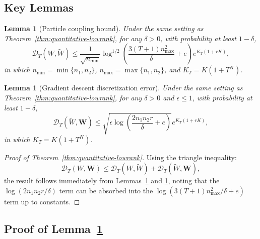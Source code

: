 \documentclass[nohyperref]{article}
\theoremstyle{plain}
\newtheorem{lemma}[theorem]{Lemma}
\theoremstyle{definition}
\theoremstyle{remark}
\begin{document}
\subsection{Key Lemmas}

\begin{lemma}[Particle coupling bound]
\label{lem:particle-lowrank}
Under the same setting as Theorem~\ref{thm:quantitative-lowrank}, for any $\delta > 0$, with probability at least $1-\delta$,
\[
\mathscr{D}_T(W, \tilde{W}) \le \frac{1}{\sqrt{n_{\min}}}\log^{1/2}\left(\frac{3(T+1)n_{\max}^2}{\delta} + e\right)e^{K_T(1+rK)},
\]
in which $n_{\min} = \min\{n_1, n_2\}$, $n_{\max} = \max\{n_1, n_2\}$, and $K_T = K(1+T^K)$.
\end{lemma}

\begin{lemma}[Gradient descent discretization error]
\label{lem:gradient-lowrank}
Under the same setting as Theorem~\ref{thm:quantitative-lowrank}, for any $\delta > 0$ and $\epsilon \le 1$, with probability at least $1-\delta$,
\[
\mathscr{D}_T(\tilde{W}, \mathbf{W}) \le \sqrt{\epsilon\log\left(\frac{2n_1n_2r}{\delta} + e\right)}e^{K_T(1+rK)},
\]
in which $K_T = K(1+T^K)$.
\end{lemma}

\begin{proof}[Proof of Theorem~\ref{thm:quantitative-lowrank}]
Using the triangle inequality:
\[
\mathscr{D}_T(W, \mathbf{W}) \le \mathscr{D}_T(W, \tilde{W}) + \mathscr{D}_T(\tilde{W}, \mathbf{W}),
\]
the result follows immediately from Lemmas~\ref{lem:particle-lowrank} and \ref{lem:gradient-lowrank}, noting that the $\log(2n_1n_2r/\delta)$ term can be absorbed into the $\log(3(T+1)n_{\max}^2/\delta + e)$ term up to constants.
\end{proof}

\subsection{Proof of Lemma~\ref{lem:particle-lowrank}}
\end{document}
